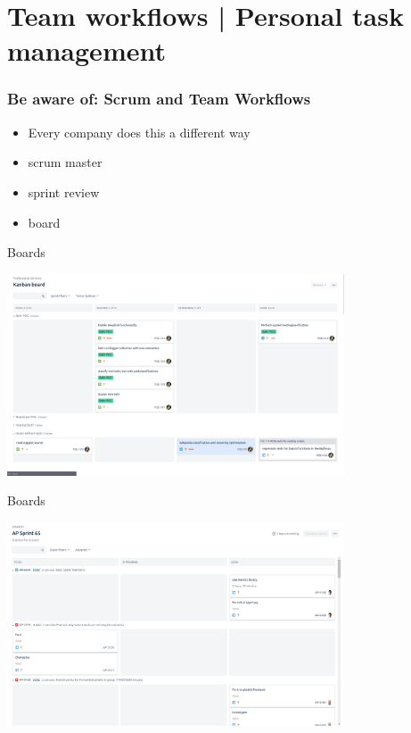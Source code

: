 \documentclass[10pt]{beamer}
\begin{document}
\appendix







\section{Team workflows | Personal task management}

\begin{frame}[c]
	\frametitle{Be aware of: Scrum and Team Workflows}
	\begin{itemize}[<+->]
		\item Every company does this a different way
		\item scrum master
		\item sprint review
		\item board
	\end{itemize}
\end{frame}

\begin{frame}[c]{Boards}
    \centerline{\includegraphics[width=10cm]{figs/pseboard.png}}


\end{frame}

\begin{frame}[c]{Boards}
    \centerline{\includegraphics[width=10cm]{figs/apboard.png}}

\end{frame}
\end{document}
